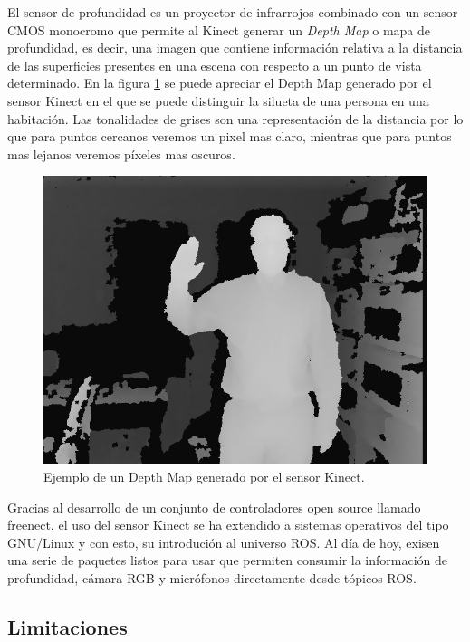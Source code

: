 El sensor de profundidad es un proyector de infrarrojos combinado con un sensor CMOS monocromo que permite al Kinect generar un \textit{Depth Map}
o mapa de profundidad, es decir, una imagen que contiene información relativa a la distancia de las superficies presentes en una escena con respecto a un punto de vista determinado. En la figura \ref{fig:depthImage} se puede apreciar el Depth Map generado por el sensor Kinect en el que se puede distinguir la silueta de una persona en una habitación. Las tonalidades de grises son una representación de la distancia por lo que para puntos cercanos veremos un pixel mas claro, mientras que para puntos mas lejanos veremos píxeles mas oscuros.

\begin{figure}[ht]
    \centering
    \includegraphics[scale=.3]{./Figures/depth_image.png}
    \caption{Ejemplo de un Depth Map generado por el sensor Kinect.}
    \label{fig:depthImage}
\end{figure}

Gracias al desarrollo de un conjunto de controladores open source llamado freenect\protect\footnotemark, el uso del sensor Kinect se ha extendido a sistemas operativos del tipo GNU/Linux y con esto, su introdución al universo ROS. Al día de hoy, exisen una serie de paquetes listos para usar que permiten consumir la información de profundidad, cámara RGB y micrófonos directamente desde tópicos ROS.


\subsection{Limitaciones}


